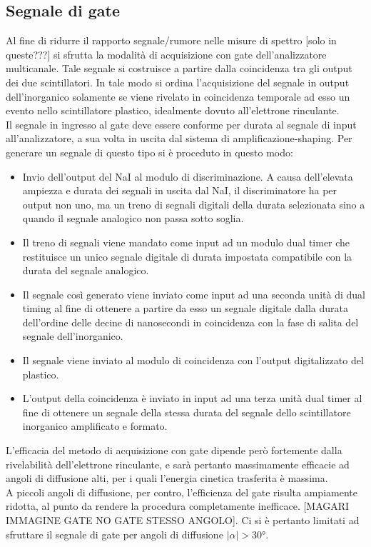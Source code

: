 \documentclass[11pt]{article}
\begin{document}
\subsection{Segnale di gate}
Al fine di ridurre il rapporto segnale/rumore nelle misure di spettro [solo in queste???] si sfrutta la modalità di acquisizione con gate dell'analizzatore multicanale. Tale segnale si costruisce a partire dalla coincidenza tra gli output dei due scintillatori. In tale modo si ordina l'acquisizione del segnale in output dell'inorganico solamente se viene rivelato in coincidenza temporale ad esso un evento nello scintillatore plastico, idealmente dovuto all'elettrone rinculante.
\\
Il segnale in ingresso al gate deve essere conforme per durata al segnale di input all'analizzatore, a sua volta in uscita dal sistema di amplificazione-shaping. Per generare un segnale di questo tipo si è proceduto in questo modo:

\begin{itemize}
	\item Invio dell'output del NaI al modulo di discriminazione. A causa dell'elevata ampiezza e durata dei segnali in uscita dal NaI, il discriminatore ha per output non uno, ma un treno di segnali digitali della durata selezionata sino a quando il segnale analogico non passa sotto soglia.
	\item Il treno di segnali viene mandato come input ad un modulo dual timer che restituisce un unico segnale digitale di durata impostata compatibile con la durata del segnale analogico.
	\item Il segnale così generato viene inviato come input ad una seconda unità di dual timing al fine di ottenere a partire da esso un segnale digitale dalla durata dell'ordine delle decine di nanosecondi in coincidenza con la fase di salita del segnale dell'inorganico.
	\item Il segnale viene inviato al modulo di coincidenza con l'output digitalizzato del plastico.
	\item L'output della coincidenza è inviato in input ad una terza unità dual timer al fine di ottenere un segnale della stessa durata del segnale dello scintillatore inorganico amplificato e formato.
\end{itemize}

L'efficacia del metodo di acquisizione con gate dipende però fortemente dalla rivelabilità dell'elettrone rinculante, e sarà pertanto massimamente efficacie ad angoli di diffusione alti, per i quali l'energia cinetica trasferita è massima. \\
A piccoli angoli di diffusione, per contro, l'efficienza del gate risulta ampiamente ridotta, al punto da rendere la procedura completamente inefficace. [MAGARI IMMAGINE GATE NO GATE STESSO ANGOLO]. Ci si è pertanto limitati ad sfruttare il segnale di gate per angoli di diffusione $|\alpha|>30°$. 
\end{document}
